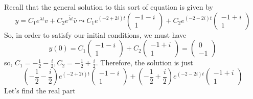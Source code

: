 \documentclass[11pt]{article}
\begin{document}
Recall that the general solution to this sort of equation is given by 
\[ y = C_1 e^{\lambda t} v + C_2 e^{\bar{\lambda} t } \bar{v} \leadsto  C_1 e^{(-2 + 2i)t}  \left( \begin{matrix} -1-i \\ 1 \end{matrix} \right) + C_2 e^{(-2 - 2i)t}  \left( \begin{matrix} -1+i \\1 \end{matrix} \right)\]
So, in order to satisfy our initial conditions, we must have
\[ y(0) =  C_1   \left( \begin{matrix} -1-i \\ 1 \end{matrix} \right) + C_2  \left( \begin{matrix} -1+i \\1 \end{matrix} \right) =  \left( \begin{matrix} 0 \\-1 \end{matrix} \right) \]
so, $C_1 =  -\frac{1}{2}-\frac{i}{2},C_2 =  -\frac{1}{2}+\frac{i}{2}$. Therefore, the solution is just
\[ \left(-\frac{1}{2}-\frac{i}{2} \right) e^{(-2 + 2i)t}  \left( \begin{matrix} -1-i \\ 1 \end{matrix} \right) + \left( -\frac{1}{2}+\frac{i}{2}\right) e^{(-2 - 2i)t}  \left( \begin{matrix} -1+i \\1 \end{matrix} \right)\]
Let's find the real part
\end{document}
